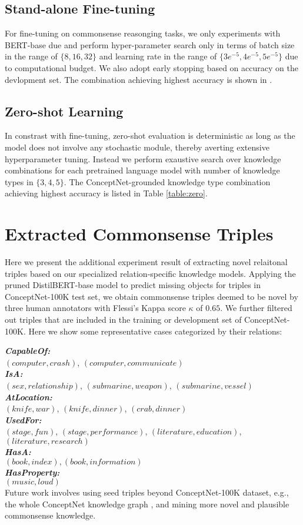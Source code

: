 \subsection{Stand-alone Fine-tuning}
For fine-tuning on commonsense reasonging tasks, we only experiments with BERT-base due and perform hyper-parameter search only in terms of batch size in the range of $\{8, 16, 32\}$ and learning rate in the range of $\{3e^{-5}, 4e^{-5}, 5e^{-5}\}$ due to computational budget. We also adopt early stopping based on accuracy on the devlopment set. The combination achieving highest accuracy is shown in .

\subsection{Zero-shot Learning}
In constrast with fine-tuning, zero-shot evaluation is deterministic as long as the model does not involve any stochastic module, thereby averting extensive hyperparameter tuning.
Instead we perform exaustive search over knowledge combinations for each pretrained language model with number of knowledge types in $\{3,4,5\}$. The ConceptNet-grounded knowledge type combination achieving highest accuracy is listed in Table \ref{table:zero}.

\section{Extracted Commonsense Triples}
Here we present the additional experiment result of extracting novel relaitonal triples based on our specialized relation-specific knowledge models.
Applying the pruned DistilBERT-base model to predict missing objects for triples in ConceptNet-100K test set, we obtain commonsense triples deemed to be novel by three human annotators with Flessi's Kappa score $\kappa$ of $0.65$. We further filtered out triples that are included in the training or development set of ConceptNet-100K. Here we show some representative cases categorized by their relations:

\noindent
\textbf{\textit{CapableOf:}}\\
$(computer, crash)$, $(computer, communicate)$\\
\textbf{\textit{IsA:}}\\
$(sex, relationship)$, $(submarine, weapon)$, $(submarine, vessel)$\\
\textbf{\textit{AtLocation:}}\\
$(knife, war)$, $(knife, dinner)$, $(crab, dinner)$\\
\textbf{\textit{UsedFor:}}\\
$(stage, fun)$, $(stage, performance)$, $(literature, education)$, $(literature, research)$\\
\textbf{\textit{HasA:}}\\
$(book, index), (book, information)$\\
\textbf{\textit{HasProperty:}}\\
$(music, loud)$\\
Future work involves using seed triples beyond ConceptNet-100K dataset, e.g., the whole ConceptNet knowledge graph , and mining more novel and plausible commonsense knowledge.


